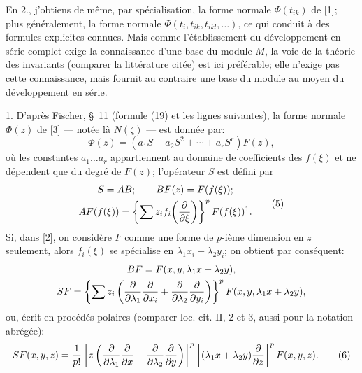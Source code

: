 En 2., j'obtiens de même, par spécialisation, la forme normale $\Phi(t_{ik})$ de [1]; plus généralement, la forme normale $\Phi(t_i,t_{ik},t_{ikl},\ldots)$, ce qui conduit à des formules explicites connues. Mais comme l'établissement du développement en série complet exige la connaissance d'une base du module $M$, la voie de la théorie des invariants (comparer la littérature citée) est ici préférable; elle n'exige pas cette connaissance, mais fournit au contraire une base du module au moyen du développement en série.

1. D'après Fischer, \S~11 (formule (19) et les lignes suivantes), la forme normale $\Phi(z)$ de [3] --- notée là $N(\zeta)$ --- est donnée par:
\begin{equation}
        \Phi(z)=(a_1S+a_2S^2+\cdots+a_rS^r)F(z),
\tag{4}
\end{equation}
où les constantes $a_1\ldots a_r$ appartiennent au domaine de coefficients des $f(\xi)$ et ne dépendent que du degré de $F(z)$; l'opérateur $S$ est défini par
\begin{equation}
\begin{gathered}
        S=AB;\qquad BF(z)=F(f(\xi));\\
        AF(f(\xi))=\left\{\sum z_i f_i\!\left(\frac{\p}{\p\xi}\right)\right\}^{p}F(f(\xi))\footnotemark.
\end{gathered}
\tag{5}
\end{equation}
Si, dans [2], on considère $F$ comme une forme de $p$-ième dimension en $z$ seulement, alors $f_i(\xi)$ se spécialise en $\lambda_1x_i+\lambda_2y_i$; on obtient par conséquent:
\[
\begin{gathered}
        BF=F(x,y,\lambda_1x+\lambda_2y),\\
        SF=\left\{\sum z_i\left(\frac{\partial}{\partial\lambda_1}\frac{\partial}{\partial x_i}+
        \frac{\partial}{\partial\lambda_2}\frac{\partial}{\partial y_i}\right)\right\}^{p}
        F(x,y,\lambda_1x+\lambda_2y),
\end{gathered}
\]
ou, écrit en procédés polaires (comparer loc. cit. II, 2 et 3, aussi pour la notation abrégée):
\begin{equation}
        SF(x,y,z)=\frac1{p!}\left[z\left(\frac{\partial}{\partial\lambda_1}\frac{\partial}{\partial x}+
        \frac{\partial}{\partial\lambda_2}\frac{\partial}{\partial y}\right)\right]^p
        \left[(\lambda_1x+\lambda_2y)\frac{\partial}{\partial z}\right]^p F(x,y,z).
\tag{6}
\end{equation}
